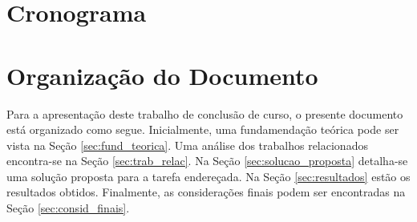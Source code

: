 \section{Cronograma}\label{sec:crono}


\section{Organização do Documento}
Para a apresentação deste trabalho de conclusão de curso, o presente documento está organizado como segue. Inicialmente, uma fundamendação teórica pode ser vista na Seção \ref{sec:fund_teorica}. Uma análise dos trabalhos relacionados encontra-se na Seção \ref{sec:trab_relac}. Na Seção \ref{sec:solucao_proposta} detalha-se uma solução proposta para a tarefa endereçada. Na Seção \ref{sec:resultados} estão os resultados obtidos. Finalmente, as considerações finais podem ser encontradas na Seção \ref{sec:consid_finais}.
